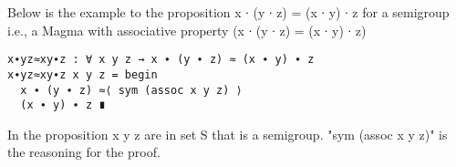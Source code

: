 Below is the example to the proposition x ∙ (y ∙ z) = (x ∙ y) ∙ z  for a semigroup i.e., a Magma with associative property (x ∙ (y ∙ z) = (x ∙ y) ∙ z) 
\begin{Verbatim}
x∙yz≈xy∙z : ∀ x y z → x ∙ (y ∙ z) ≈ (x ∙ y) ∙ z
x∙yz≈xy∙z x y z = begin 
  x ∙ (y ∙ z) ≈⟨ sym (assoc x y z) ⟩ 
  (x ∙ y) ∙ z ∎
\end{Verbatim}
In the proposition x y z are in set S that is a semigroup. "sym (assoc x y z)" is the reasoning for the proof.

